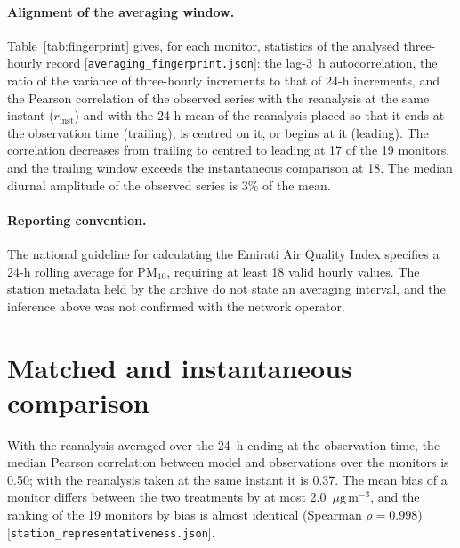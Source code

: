 \documentclass[11pt]{article}
\newcommand*{\ugm}{\ensuremath{\mu\mathrm{g\,m^{-3}}}}
\newcommand*{\pmten}{\ensuremath{\mathrm{PM_{10}}}}
\begin{document}
\paragraph{Alignment of the averaging window.} Table~\ref{tab:fingerprint} gives, for each
monitor, statistics of the analysed three-hourly record [\texttt{averaging\_fingerprint.json}]:
the lag-3~h autocorrelation, the ratio of the variance of three-hourly increments to that of
24-h increments, and the Pearson correlation of the observed series with the reanalysis at the
same instant ($r_\mathrm{inst}$) and with the 24-h mean of the reanalysis placed so that it ends
at the observation time (trailing), is centred on it, or begins at it (leading). The correlation
decreases from trailing to centred to leading at 17 of the 19 monitors, and the trailing window
exceeds the instantaneous comparison at 18. The median diurnal amplitude of the observed series
is 3\% of the mean.

\paragraph{Reporting convention.} The national guideline for calculating the Emirati Air Quality
Index specifies a 24-h rolling average for \pmten{}, requiring at least 18 valid hourly values.
The station metadata held by the archive do not state an averaging interval, and the inference
above was not confirmed with the network operator.

\begin{table}[ht]\centering\small
\caption{Statistics of the analysed three-hourly record by monitor. $N$: values. ACF(3~h):
lag-3~h autocorrelation. Var.\ ratio: variance of three-hourly increments divided by variance of
24-h increments. $r$: Pearson correlation with the reanalysis at the same instant and with its
24-h mean in three alignments. Diurnal: amplitude of the mean diurnal cycle relative to the
mean.}
\label{tab:fingerprint}
\resizebox{0.95\textwidth}{!}{}
\end{table}

\clearpage
\section{Matched and instantaneous comparison}

With the reanalysis averaged over the 24~h ending at the observation time, the median Pearson
correlation between model and observations over the monitors is 0.50; with the reanalysis taken
at the same instant it is 0.37. The mean bias of a monitor differs between the two treatments by
at most 2.0~\ugm{}, and the ranking of the 19 monitors by bias is almost identical (Spearman
$\rho=0.998$) [\texttt{station\_representativeness.json}].
\end{document}

